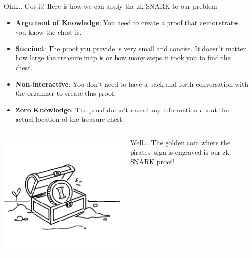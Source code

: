 \documentclass{zkdl-presentation-template}
\begin{document}
    \begin{frame}{Ohh... Got it!}
        Here is how we can apply the zk-SNARK to our problem:

        \begin{itemize} 
            \item \textbf{Argument of Knowledge}: You need to create a proof that demonstrates you know the
            chest is. \pause
            \item \textbf{Succinct}: The proof you provide is very small and concise. It doesn't matter how
            large the treasure map is or how many steps it took you to find the chest. \pause
            \item \textbf{Non-interactive}: You don't need to have a back-and-forth conversation with the 
            organizer to create this proof. \pause
            \item \textbf{Zero-Knowledge}: The proof doesn't reveal any information about the actual 
            location of the treasure chest.
        \end{itemize}

        \pause \vspace{-10pt}

        \begin{columns}
            \begin{column}{0.3\textwidth}
                \includegraphics[width=\textwidth]{../presentations/images/lecture_8/treasure.png}
            \end{column}

            \begin{column}{0.65\textwidth}
                Well... The golden coin where the pirates' sign is engraved is our zk-SNARK proof!
            \end{column}
        \end{columns}
    \end{frame}
\end{document}
